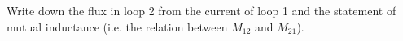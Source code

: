 

\vspace*{\fill}
\centering

Write down the flux in loop 2 from the current of loop 1 and the statement of mutual inductance (i.e. the relation between $M_{12}$ and $M_{21}$).

\centering
\vspace*{\fill}

